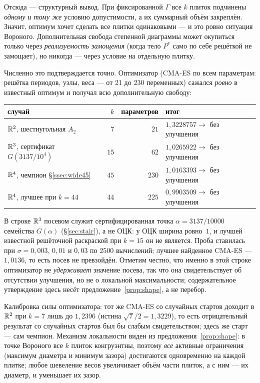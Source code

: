 Отсюда --- структурный вывод. При фиксированной $\Gamma$ все $k$ плиток
подчинены \emph{одному и тому же} условию допустимости, а их суммарный объём
закреплён. Значит, оптимум хочет сделать все плитки одинаковыми --- и это ровно
ситуация Вороного. Дополнительная свобода степенной диаграммы может окупиться
только через \emph{реализуемость замощения} (когда тело $P^*$ само по себе
решёткой не замощает), но никогда --- через условие на отдельную плитку.

Численно это подтверждается точно. Оптимизатор (CMA-ES по всем параметрам:
решётка периодов, узлы, веса --- от 21 до 230 переменных) сажался \emph{ровно} в
известный оптимум и получал всю дополнительную свободу:

\begin{center}
\begin{tabular}{@{}lrrl@{}}
\toprule
случай & $k$ & параметров & итог\\
\midrule
$\mathbb{R}^2$, шестиугольная $A_2$ & $7$  & $21$  & $1{,}3228757\to$ без улучшения\\
$\mathbb{R}^3$, сертификат $G(3137/10^4)$ & $15$ & $62$  & $1{,}0265922\to$ без улучшения\\
$\mathbb{R}^4$, чемпион \S\ref{ssec:wide45} & $45$ & $230$ & $1{,}0163393\to$ без улучшения\\
$\mathbb{R}^4$, лучшее при $k=44$ & $44$ & $225$ & $0{,}9903509\to$ без улучшения\\
\bottomrule
\end{tabular}
\end{center}

В строке $\mathbb{R}^3$ посевом служит сертифицированная точка
$\alpha=3137/10000$ семейства $G(\alpha)$ (\S\ref{sec:stair}), а не ОЦК:
у ОЦК ширина ровно~$1$, и лучшей известной решёточной раскраской при $k=15$
он не является. Проба ставилась при $\sigma=0{,}003$, $0{,}01$ и $0{,}03$ по
$2500$ вычислений; лучшее найденное CMA-ES --- $1{,}0136$, то есть посев не
превзойдён. Отметим честно, что
именно в этой строке оптимизатор не \emph{удерживает} значение посева, так что
она свидетельствует об отсутствии улучшения, но не о локальной максимальности;
содержательное утверждение здесь несёт предложение~\ref{prop:shape}, а не
перебор.

Калибровка силы оптимизатора: тот же CMA-ES со случайных стартов доходит в
$\mathbb{R}^2$ при $k=7$ лишь до $1{,}2396$ (истина $\sqrt7/2=1{,}3229$), то есть
отрицательный результат со случайных стартов был бы слабым свидетельством;
здесь же старт --- сам чемпион.
Механизм локальности виден из предложения~\ref{prop:shape}: в точке Вороного
все $k$ плиток конгруэнтны, поэтому \emph{все} активные ограничения (максимум
диаметра и минимум зазора) достигаются одновременно на каждой плитке; любое
шевеление весов увеличивает объём части плиток, а с ним --- их диаметр, и
уменьшает их зазор.

